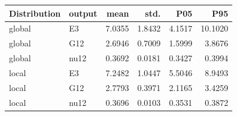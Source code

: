 \begin{tabular}{llrrrr}
\toprule
Distribution & output & mean & std. & P05 & P95 \\
\midrule
global & E3 & 7.0355 & 1.8432 & 4.1517 & 10.1020 \\ 
global & G12 & 2.6946 & 0.7009 & 1.5999 & 3.8676 \\ 
global & nu12 & 0.3692 & 0.0181 & 0.3427 & 0.3994 \\ 
local & E3 & 7.2482 & 1.0447 & 5.5046 & 8.9493 \\ 
local & G12 & 2.7793 & 0.3971 & 2.1165 & 3.4259 \\ 
local & nu12 & 0.3696 & 0.0103 & 0.3531 & 0.3872 \\ 
\bottomrule
\end{tabular}
